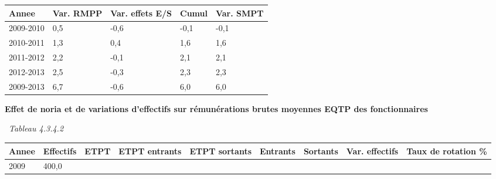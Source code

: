 \begin{longtable}[]{@{}lllll@{}}
\toprule
Annee & Var. RMPP & Var. effets E/S & Cumul & Var. SMPT\tabularnewline
\midrule
\endhead
2009-2010 & 0,5 & -0,6 & -0,1 & -0,1\tabularnewline
2010-2011 & 1,3 & 0,4 & 1,6 & 1,6\tabularnewline
2011-2012 & 2,2 & -0,1 & 2,1 & 2,1\tabularnewline
2012-2013 & 2,5 & -0,3 & 2,3 & 2,3\tabularnewline
2009-2013 & 6,7 & -0,6 & 6,0 & 6,0\tabularnewline
\bottomrule
\end{longtable}

\textbf{Effet de noria et de variations d'effectifs sur rémunérations
brutes moyennes EQTP des fonctionnaires}

~\emph{Tableau 4.3.4.2}

\begin{longtable}[]{@{}lllllllll@{}}
\toprule
\begin{minipage}[b]{0.05\columnwidth}\raggedright
Annee\strut
\end{minipage} & \begin{minipage}[b]{0.08\columnwidth}\raggedright
Effectifs\strut
\end{minipage} & \begin{minipage}[b]{0.05\columnwidth}\raggedright
ETPT\strut
\end{minipage} & \begin{minipage}[b]{0.10\columnwidth}\raggedright
ETPT entrants\strut
\end{minipage} & \begin{minipage}[b]{0.10\columnwidth}\raggedright
ETPT sortants\strut
\end{minipage} & \begin{minipage}[b]{0.07\columnwidth}\raggedright
Entrants\strut
\end{minipage} & \begin{minipage}[b]{0.07\columnwidth}\raggedright
Sortants\strut
\end{minipage} & \begin{minipage}[b]{0.11\columnwidth}\raggedright
Var. effectifs\strut
\end{minipage} & \begin{minipage}[b]{0.14\columnwidth}\raggedright
Taux de rotation \%\strut
\end{minipage}\tabularnewline
\midrule
\endhead
\begin{minipage}[t]{0.05\columnwidth}\raggedright
2009\strut
\end{minipage} & \begin{minipage}[t]{0.08\columnwidth}\raggedright
400,0\strut

\end{minipage}
\end{longtable}
